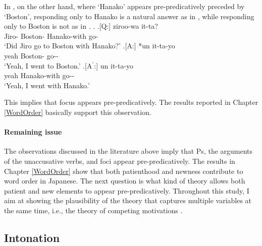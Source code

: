 In \Next,
on the other hand,
where `Hanako' appears pre-predicatively preceded by `Boston',
responding only to Hanako is a natural answer as in \Next[A$^{\prime}$],
while responding only to Boston is not as in \Next[A].
%
\ex.
 \a.[Q:] ziroo-wa   it-ta? \\
         Jiro- Boston- Hanako-with go- \\
         `Did Jiro go to Boston with Hanako?'
 \bg.[A:] *un  it-ta-yo \\
           yeah Boston- go-- \\
           `Yeah, I went to Boston.'
 \bg.[A$^{\prime}$:] un  it-ta-yo \\
           yeah Hanako-with go-- \\
           `Yeah, I went with Hanako.'
           \hfill{\cite[54]{kuno78}}

This implies that focus appears pre-predicatively.
The results reported in Chapter \ref{WordOrder} basically support this observation.

\paragraph{Remaining issue}

The observations discussed in the literature above imply that
Ps, the arguments of the unaccusative verbs, and foci appear pre-predicatively.
The results in Chapter \ref{WordOrder} show that both patienthood and newness contribute to word order in Japanese.
The next question is what kind of theory allows both patient and new elements to appear pre-predicatively.
Throughout this study,
I aim at showing the plausibility of the theory that captures multiple variables at the same time, i.e., the theory of competing motivations \cite{dubois85}.



\subsection{Intonation}\label{BackSubIntonation}

